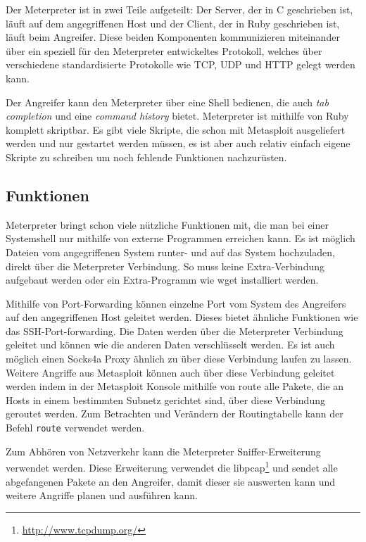 Der Meterpreter ist in zwei Teile aufgeteilt: Der Server, der in C
geschrieben ist, läuft auf dem angegriffenen Host und der Client, der in
Ruby geschrieben ist, läuft beim Angreifer. Diese beiden Komponenten
kommunizieren miteinander über ein speziell für den Meterpreter
entwickeltes Protokoll, welches über verschiedene standardisierte
Protokolle wie TCP, UDP und HTTP gelegt werden kann.

Der Angreifer kann den Meterpreter über eine Shell bedienen, die auch
\emph{tab completion} und eine \emph{command history} bietet. Meterpreter
ist mithilfe von Ruby komplett skriptbar. Es gibt viele Skripte, die
schon mit Metasploit ausgeliefert werden und nur gestartet werden müssen,
es ist aber auch relativ einfach eigene Skripte zu schreiben um noch
fehlende Funktionen nachzurüsten.

\subsection{Funktionen}
\label{compositions:meterpreter:funktionen}
Meterpreter bringt schon viele nützliche Funktionen mit, die man bei
einer Systemshell nur mithilfe von externe Programmen erreichen kann.
Es ist möglich Dateien vom angegriffenen System runter- und auf das
System hochzuladen, direkt über die Meterpreter Verbindung. So muss keine
Extra-Verbindung aufgebaut werden oder ein Extra-Programm wie wget
installiert werden.

Mithilfe von Port-Forwarding können einzelne Port vom System des
Angreifers auf den angegriffenen Host geleitet werden. Dieses bietet
ähnliche Funktionen wie das SSH-Port-forwarding. Die Daten werden über
die Meterpreter Verbindung geleitet und können wie die anderen Daten
verschlüsselt werden. Es ist auch möglich einen Socks4a Proxy ähnlich zu
\cite{rfc-1928} über diese Verbindung laufen zu lassen. Weitere Angriffe
aus Metasploit können auch über diese Verbindung geleitet werden indem
in der Metasploit Konsole mithilfe von route alle Pakete, die an Hosts
in einem bestimmten Subnetz gerichtet sind, über diese Verbindung
geroutet werden. Zum Betrachten und Verändern der Routingtabelle kann
der Befehl \texttt{route} verwendet werden.

Zum Abhören von Netzverkehr kann die Meterpreter Sniffer-Erweiterung
verwendet werden. Diese Erweiterung verwendet die libpcap\footnote{%
\url{http://www.tcpdump.org/}} und sendet alle abgefangenen Pakete an
den Angreifer, damit dieser sie auswerten kann und weitere Angriffe
planen und ausführen kann.

